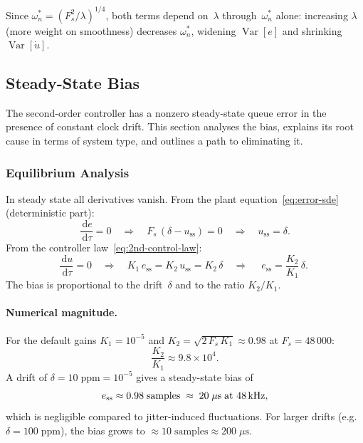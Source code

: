 \documentclass[11pt, a4paper]{article}
\theoremstyle{definition}
\theoremstyle{plain}
\theoremstyle{remark}
\newcommand{\Var}{\operatorname{Var}}
\newcommand{\dd}{\,\mathrm{d}}                   %
\begin{document}
Since $\omega_n^* = (F_s^2/\lambda)^{1/4}$, both terms depend
on~$\lambda$ through~$\omega_n^*$ alone: increasing $\lambda$
(more weight on smoothness) decreases $\omega_n^*$, widening
$\Var[e]$ and shrinking $\Var[\dot{u}]$.



\subsection{Steady-State Bias}\label{sec:bias}

The second-order controller has a nonzero steady-state queue error
in the presence of constant clock drift.  This section analyses the
bias, explains its root cause in terms of system type, and outlines
a path to eliminating it.

\subsubsection{Equilibrium Analysis}

In steady state all derivatives vanish.  From the plant
equation~\eqref{eq:error-sde} (deterministic part):
\begin{equation}\label{eq:ss-plant}
  \frac{\dd e}{\dd\tau} = 0
  \quad\Longrightarrow\quad
  F_s\,(\delta - u_{\text{ss}}) = 0
  \quad\Longrightarrow\quad
  u_{\text{ss}} = \delta.
\end{equation}
From the controller law~\eqref{eq:2nd-control-law}:
\begin{equation}\label{eq:ss-controller}
  \frac{\dd u}{\dd\tau} = 0
  \quad\Longrightarrow\quad
  K_1\,e_{\text{ss}} = K_2\,u_{\text{ss}} = K_2\,\delta
  \quad\Longrightarrow\quad
  \boxed{\;e_{\text{ss}} = \frac{K_2}{K_1}\,\delta.\;}
\end{equation}
The bias is proportional to the drift~$\delta$ and to the ratio
$K_2/K_1$.

\paragraph{Numerical magnitude.}
For the default gains $K_1 = 10^{-5}$ and
$K_2 = \sqrt{2\,F_s\,K_1} \approx 0.98$ at $F_s = 48\,000$:
\begin{equation}
  \frac{K_2}{K_1} \approx 9.8 \times 10^4.
\end{equation}
A drift of $\delta = 10\;\text{ppm} = 10^{-5}$ gives a steady-state
bias of
\begin{equation}
  e_{\text{ss}} \approx 0.98\;\text{samples}
  \;\approx\; 20\;\mu\text{s}\;\text{at 48\,kHz},
\end{equation}
which is negligible compared to jitter-induced fluctuations.
For larger drifts (e.g.\ $\delta = 100\;\text{ppm}$), the bias
grows to $\approx 10\;\text{samples} \approx 200\;\mu\text{s}$.
\end{document}
